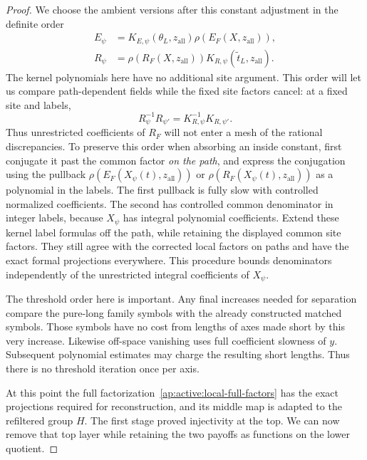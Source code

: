 \begin{proof}
We choose the ambient versions after this constant adjustment in
the definite order
\begin{equation}
 \begin{aligned}
 E_\psi&=K_{E,\psi}(\theta_L,z_{\mathrm{all}})
                   \rho(E_F(X,z_{\mathrm{all}})),\\
 R_\psi&=\rho(R_F(X,z_{\mathrm{all}}))
                   K_{R,\psi}(\widetilde t_L,z_{\mathrm{all}}).
 \end{aligned}
 \label{ap:active:ordered-outer-factors}
\end{equation}
The kernel polynomials here have no additional site argument.  This
order will let us compare path-dependent fields while the fixed site
factors cancel: at a fixed site and labels,
\[
 R_\psi^{-1}R_{\psi'}=K_{R,\psi}^{-1}K_{R,\psi'}.
\]
Thus unrestricted coefficients of $R_F$ will not enter a mesh of the
rational discrepancies.  To preserve this order when absorbing an inside constant, first
conjugate it past the common factor \emph{on the path}, and express
the conjugation using the pullback
$\rho(E_F(X_\psi(t),z_{\mathrm{all}}))$ or
$\rho(R_F(X_\psi(t),z_{\mathrm{all}}))$ as a polynomial in the
labels.  The first pullback is fully slow with controlled normalized
coefficients.  The second has controlled common denominator in
integer labels, because $X_\psi$ has integral polynomial
coefficients.  Extend these kernel label formulas off the path,
while retaining the displayed common site factors.  They still
agree with the corrected local factors on paths and have the
exact formal projections everywhere.  This procedure bounds
denominators independently of the unrestricted integral
coefficients of $X_\psi$.

The threshold order here is important.  Any final increases needed
for separation compare the pure-long family symbols with the
already constructed matched symbols.  Those symbols have no cost
from lengths of axes made short by this very increase.  Likewise
off-space vanishing uses full coefficient slowness of $y$.
Subsequent polynomial estimates may charge the resulting short
lengths.  Thus there is no threshold iteration once per axis.

At this point the full factorization~\eqref{ap:active:local-full-factors}
has the exact projections required for reconstruction, and its middle
map is adapted to the refiltered group $H$.  The first stage proved
injectivity at the top.  We can now remove that top layer while
retaining the two payoffs as functions on the lower quotient.


\end{proof}
